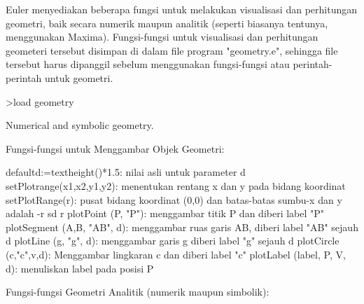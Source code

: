 \documentclass[a4paper,10pt]{article}
\begin{document}
\begin{eulernotebook}
\begin{eulercomment}
Euler menyediakan beberapa fungsi untuk melakukan visualisasi dan perhitungan geometri, baik
secara numerik maupun analitik (seperti biasanya tentunya, menggunakan Maxima).
Fungsi-fungsi untuk visualisasi dan perhitungan geometeri tersebut disimpan di dalam file
program "geometry.e", sehingga file tersebut harus dipanggil sebelum menggunakan
fungsi-fungsi atau perintah-perintah untuk geometri.
\end{eulercomment}
\begin{eulerprompt}
>load geometry
\end{eulerprompt}
\begin{euleroutput}
  Numerical and symbolic geometry.
\end{euleroutput}
\begin{eulercomment}
Fungsi-fungsi untuk Menggambar Objek Geometri:

\end{eulercomment}
\begin{eulerttcomment}
  defaultd:=textheight()*1.5: nilai asli untuk parameter d
  setPlotrange(x1,x2,y1,y2): menentukan rentang x dan y pada bidang koordinat
  setPlotRange(r): pusat bidang koordinat (0,0) dan batas-batas sumbu-x dan y adalah -r sd r
  plotPoint (P, "P"): menggambar titik P dan diberi label "P"
  plotSegment (A,B, "AB", d): menggambar ruas garis AB, diberi label "AB" sejauh d
  plotLine (g, "g", d): menggambar garis g diberi label "g" sejauh d
  plotCircle (c,"c",v,d): Menggambar lingkaran c dan diberi label "c"
  plotLabel (label, P, V, d): menuliskan label pada posisi P
\end{eulerttcomment}
\begin{eulercomment}

Fungsi-fungsi Geometri Analitik (numerik maupun simbolik):


\end{eulercomment}
\end{eulernotebook}
\end{document}
